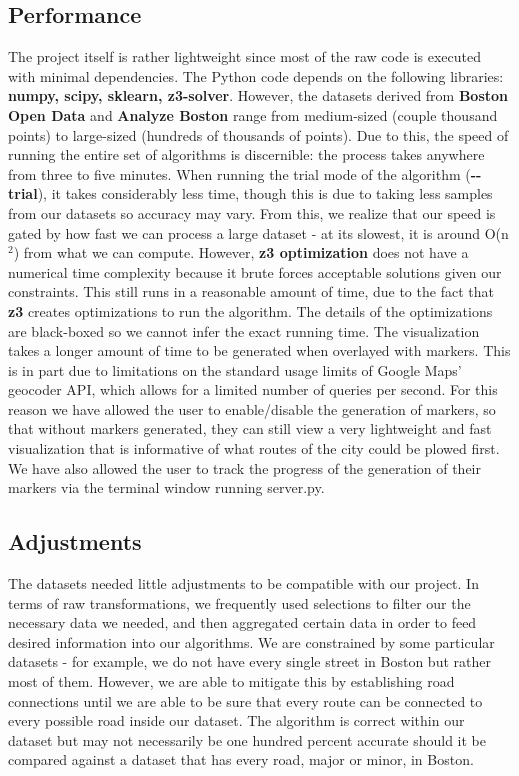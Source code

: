 \documentclass[15pt]{report}
\begin{document}
\subsection*{Performance}
The project itself is rather lightweight since most of the raw code is executed with minimal dependencies. The Python code depends on the following libraries: \textbf{numpy, scipy, sklearn, z3-solver}. However, the datasets derived from \textbf{Boston Open Data} and \textbf{Analyze Boston} range from medium-sized (couple thousand points) to large-sized (hundreds of thousands of points). Due to this, the speed of running the entire set of algorithms is discernible: the process takes anywhere from three to five minutes. When running the trial mode of the algorithm (\textbf{-{}-trial}), it takes considerably less time, though this is due to taking less samples from our datasets so accuracy may vary. From this, we realize that our speed is gated by how fast we can process a large dataset - at its slowest, it is around O(n$^2$) from what we can compute. However, \textbf{z3 optimization} does not have a numerical time complexity because it brute forces acceptable solutions given our constraints. This still runs in a reasonable amount of time, due to the fact that \textbf{z3} creates optimizations to run the algorithm. The details of the optimizations are black-boxed so we cannot infer the exact running time. The visualization takes a longer amount of time to be generated when overlayed with markers. This is in part due to limitations on the standard usage limits of Google Maps' geocoder API, which allows for a limited number of queries per second. For this reason we have allowed the user to enable/disable the generation of markers, so that  without markers generated, they can still view a very lightweight and fast visualization that is informative of what routes of the city could be plowed first. We have also allowed the user to track the progress of the generation of their markers via the terminal window running server.py.

\subsection*{Adjustments}
The datasets needed little adjustments to be compatible with our project. In terms of raw transformations, we frequently used selections to filter our the necessary data we needed, and then aggregated certain data in order to feed desired information into our algorithms. We are constrained by some particular datasets - for example, we do not have every single street in Boston but rather most of them. However, we are able to mitigate this by establishing road connections until we are able to be sure that every route can be connected to every possible road inside our dataset. The algorithm is correct within our dataset but may not necessarily be one hundred percent accurate should it be compared against a dataset that has every road, major or minor, in Boston.
\end{document}
